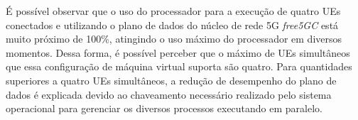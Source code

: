 É possível observar que o uso do processador para a execução de quatro UEs conectados e utilizando o plano de dados do núcleo de rede 5G \textit{free5GC} está muito próximo de 100\%, atingindo o uso máximo do processador em diversos momentos.
Dessa forma, é possível perceber que o máximo de UEs simultâneos que essa configuração de máquina virtual suporta são quatro.
Para quantidades superiores a quatro UEs simultâneos, a redução de desempenho do plano de dados é explicada devido ao chaveamento necessário realizado pelo sistema operacional para gerenciar os diversos processos executando em paralelo.
